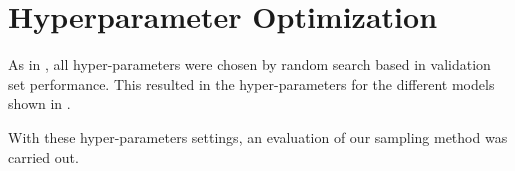 \section{Hyperparameter Optimization}
\label{sec:hyperparameter_optimization}

As in \cite{TuckER}, all hyper-parameters were chosen by random search based in validation set performance.
This resulted in the hyper-parameters for the different models shown in .

With these hyper-parameters settings, an evaluation of our sampling method \ucgan was carried out.
